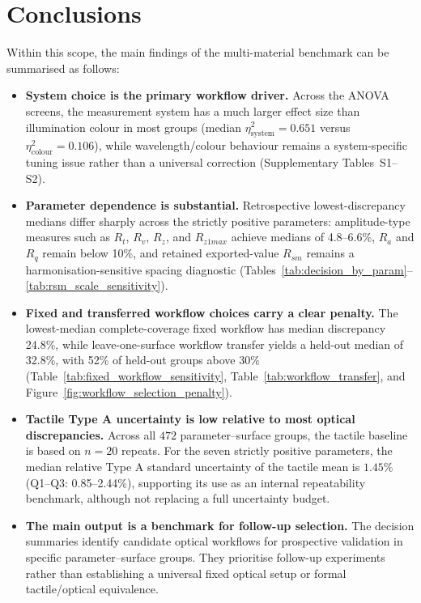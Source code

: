 \documentclass{article}
\begin{document}
\section{Conclusions}

Within this scope, the main findings of the multi-material benchmark can be summarised as follows:
\begin{itemize}
	\item \textbf{System choice is the primary workflow driver.} Across the ANOVA screens, the measurement system has a much larger effect size than illumination colour in most groups (median $\eta^2_{\mathrm{system}}=0.651$ versus $\eta^2_{\mathrm{colour}}=0.106$), while wavelength/colour behaviour remains a system-specific tuning issue rather than a universal correction (Supplementary Tables~S1--S2).
	\item \textbf{Parameter dependence is substantial.} Retrospective lowest-discrepancy medians differ sharply across the strictly positive parameters: amplitude-type measures such as $R_t$, $R_v$, $R_z$, and $R_{z1max}$ achieve medians of 4.8--6.6\%, $R_a$ and $R_q$ remain below 10\%, and retained exported-value $R_{sm}$ remains a harmonisation-sensitive spacing diagnostic (Tables~\ref{tab:decision_by_param}--\ref{tab:rsm_scale_sensitivity}).
	\item \textbf{Fixed and transferred workflow choices carry a clear penalty.} The lowest-median complete-coverage fixed workflow has median discrepancy 24.8\%, while leave-one-surface workflow transfer yields a held-out median of 32.8\%, with 52\% of held-out groups above 30\% (Table~\ref{tab:fixed_workflow_sensitivity}, Table~\ref{tab:workflow_transfer}, and Figure~\ref{fig:workflow_selection_penalty}).
	\item \textbf{Tactile Type A uncertainty is low relative to most optical discrepancies.} Across all $472$ parameter--surface groups, the tactile baseline is based on $n=20$ repeats. For the seven strictly positive parameters, the median relative Type A standard uncertainty of the tactile mean is $1.45\%$ (Q1--Q3: 0.85--2.44\%), supporting its use as an internal repeatability benchmark, although not replacing a full uncertainty budget.
	\item \textbf{The main output is a benchmark for follow-up selection.} The decision summaries identify candidate optical workflows for prospective validation in specific parameter--surface groups. They prioritise follow-up experiments rather than establishing a universal fixed optical setup or formal tactile/optical equivalence.
\end{itemize}
\end{document}
